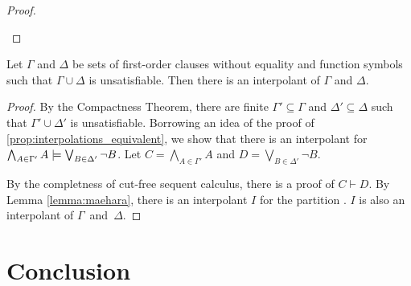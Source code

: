 \begin{proof}
\begin{description}
\begin{comment}
					\begin{prooftree}
						\Axiomm{I_1, \Gamma_2 \fCenter \Delta_2}
						\Axiomm{I_2, \Sigma_2 \fCenter \Pi_2}
						\RightLabelm{\lkrule{\lor}{l}}
						\BinaryInfm{I_1\lor I_2, \Gamma_2, \Sigma_2 \fCenter \Delta_2, \Pi_2}
					\end{prooftree}


					We furthermore get by the induction hypothesis that

					$\Lang(I_1) \subseteq \Lang(\Gamma_1, \Delta_1, A\subst{T/t}) \cap (\Gamma_2, \Delta_2)$

					$\Lang(I_2) \subseteq \Lang(\Sigma_1, \Pi_1, s=t) \cap (\Sigma_2, \Pi_2)$

					$\Lang(I_1 \lor I_2) \subseteq \Lang(\Gamma_1, \Sigma_1, \Delta_1, \Pi_1, A\subst{T/s}) \cap (\Gamma_2 \Sigma_2, \Delta_2, \Pi_2)$

					\end{enumerate}

			\end{itemize}
		\end{comment}
			\end{description}
		\end{proof}


\begin{thm}
	\label{thm:prop_interpol}
	Let $\Gamma$ and $\Delta$ be sets of first-order clauses without equality and function symbols such that $\Gamma \cup \Delta$ is unsatisfiable. Then there is an interpolant of $\Gamma$ and $\Delta$.
\end{thm}
\begin{proof}
	By the Compactness Theorem, there are finite $\Gamma' \subseteq \Gamma$ and $\Delta' \subseteq \Delta$ such that $\Gamma' \cup \Delta'$ is unsatisfiable.
	Borrowing an idea of the proof of \ref{prop:interpolations_equivalent},
	we show that there is an interpolant for $\bigwedge_{A\in \Gamma'}A \models \bigvee_{B \in \Delta'} \lnot B$.
	Let $C = \bigwedge_{A \in \Gamma'} A$ and $D = \bigvee_{B \in \Delta'} \lnot B$.

	By the completness of cut-free sequent calculus, there is a proof of $C \vdash D$.
	By Lemma \ref{lemma:maehara}, there is an interpolant $I$ for the partition . $I$ is also an interpolant of $\Gamma$~and~$\Delta$.

\end{proof}





		\section{Conclusion}

